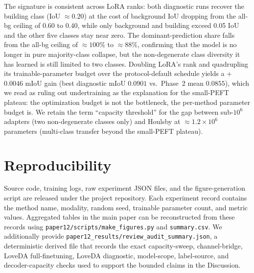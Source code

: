 \documentclass[11pt]{article}
\begin{document}
The signature is consistent across LoRA ranks: both diagnostic runs recover the building class (IoU $\approx 0.20$) at the cost of background IoU dropping from the all-bg ceiling of $0.60$ to $0.40$, while only background and building exceed 0.05 IoU and the other five classes stay near zero. The dominant-prediction share falls from the all-bg ceiling of $\approx$$100\%$ to $\approx$$88\%$, confirming that the model is no longer in pure majority-class collapse, but the non-degenerate class diversity it has learned is still limited to two classes. Doubling LoRA's rank and quadrupling its trainable-parameter budget over the protocol-default schedule yields a +$0.0046$ mIoU gain (best diagnostic mIoU $0.0901$ vs.\ Phase~2 mean $0.0855$), which we read as ruling out undertraining as the explanation for the small-PEFT plateau: the optimization budget is not the bottleneck, the per-method parameter budget is. We retain the term ``capacity threshold'' for the gap between sub-$10^6$ adapters (two non-degenerate classes only) and Houlsby at $\approx$$1.2 \times 10^6$ parameters (multi-class transfer beyond the small-PEFT plateau).

\section{Reproducibility}
\label{app:repro}

Source code, training logs, raw experiment JSON files, and the figure-generation script are released under the project repository. Each experiment record contains the method name, modality, random seed, trainable parameter count, and metric values. Aggregated tables in the main paper can be reconstructed from these records using \texttt{paper12/scripts/make\_figures.py} and \texttt{summary.csv}. We additionally provide \texttt{paper12\_results/review\_audit\_summary.json}, a deterministic derived file that records the exact capacity-sweep, channel-bridge, LoveDA full-finetuning, LoveDA diagnostic, model-scope, label-source, and decoder-capacity checks used to support the bounded claims in the Discussion.
\end{document}
